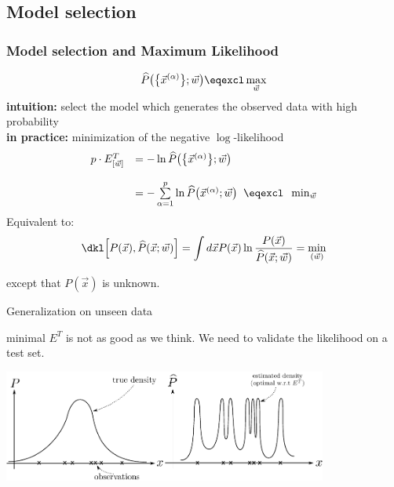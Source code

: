 \subsection{Model selection}
\begin{frame} \frametitle{Model selection and Maximum Likelihood}
\begin{equation*}
        \widehat{P}\big(\big\{\vec{x}^{(\alpha)}\big\};\vec{w}\big)
                \eqexcl \max_{\vec{w}}
\end{equation*}
\textbf{intuition:} select the model which generates the observed data with high probability\\
\vspace{5mm}
\textbf{in practice:} minimization of the negative $\log$-likelihood
\begin{equation*}
        \begin{array}{ll}
                p \cdot E_{[\vec{w}]}^T
                & = -\ln \widehat{P}\big(\big\{\vec{x}^{(\alpha)}\big\}
                        ;\vec{w}\big) \\\\
                & = -\sum\limits_{\alpha = 1}^p \ln \widehat{P}
                        \big( \vec{x}^{(\alpha)};\vec{w} \big)
                \;\; \eqexcl \;\; \min_{\vec{w}} 
        \end{array}
\end{equation*}
Equivalent to:
\begin{equation}
	\dkl\Big[P(\vec{x}),\widehat{P}(\vec{x};\vec{w})\Big] = \int d \vec{x} P(\vec{x}) \ln 
		\frac{P(\vec{x})}{\widehat{P}(\vec{x};\vec{w})} = \min_{(\vec{w})}
\end{equation}

except that $P(\vec{x})$ is unknown.

\end{frame}

\begin{frame}{Generalization on unseen data}

minimal $E^T$ is not as good as we think. We need to validate the likelihood on a test set.

\begin{center}
	\includegraphics[width=0.8\textwidth]{img/section1_fig3}
\end{center}

\end{frame}
